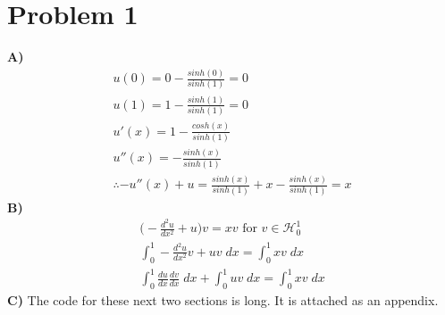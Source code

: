 \documentclass[10pt]{article}
\newcommand{\tbf}[1]{\textbf{#1}}
\newcommand{\ptl}[2]{\frac{d^2 #1}{d #2 ^2}}
\newcommand{\pl}[2]{\frac{d #1}{d #2}}
\newcommand{\iab}[2]{\int_#1^#2}
\begin{document}
\section*{Problem 1}
\tbf{A)}\begin{gather*}
u(0) = 0 - \frac{sinh(0)}{sinh(1)} = 0\\u(1) = 1 - \frac{sinh(1)}{sinh(1)} = 0\\
u'(x) = 1 - \frac{cosh(x)}{sinh(1)}\\
u''(x) = -\frac{sinh(x)}{sinh(1)}\\
\therefore -u''(x) + u = \frac{sinh(x)}{sinh(1)} + x - \frac{sinh(x)}{sinh(1)} = x
\end{gather*}
\tbf{B)}\begin{gather*}
\Bigg(-\ptl{u}{x}+u\Bigg)v=xv\textrm{ for }v\in \mathcal{H}_0^1\\
\iab{0}{1}-\ptl{u}{x}v+uv\;dx = \iab{0}{1}xv\;dx\\
\iab{0}{1}\pl{u}{x}\pl{v}{x}\;dx+\iab{0}{1}uv\;dx = \iab{0}{1}xv\;dx
\end{gather*}
\tbf{C)} The code for these next two sections is long. It is attached as an appendix.
\end{document}
